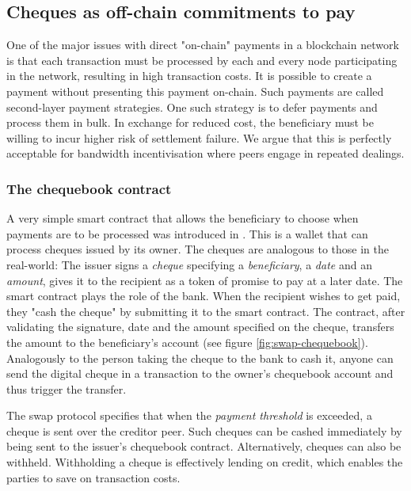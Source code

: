 \subsection{Cheques as off-chain commitments to pay}\label{sec:cheques}

One of the major issues with direct "on-chain" payments in a blockchain network is that each transaction must be processed by each and every node participating in the network, resulting in high transaction costs. It is possible to create a payment without presenting this payment on-chain. Such payments are called second-layer payment strategies. One such strategy is to defer payments and process them in bulk. In exchange for reduced cost, the beneficiary must be willing to incur higher risk of settlement failure. We argue that this is perfectly acceptable for bandwidth incentivisation where peers engage in repeated dealings.


\subsubsection{The chequebook contract}

A very simple smart contract that allows the beneficiary to choose when payments are to be processed was introduced in \cite{ethersphere2016sw3}. This  is a wallet that can process cheques issued by its owner. The cheques are analogous to those in the real-world: The issuer signs a \emph{cheque} specifying a \emph{beneficiary}, a \emph{date} and an \emph{amount}, gives it to the recipient as a token of promise to pay at a later date. The smart contract plays the role of the bank. When the recipient wishes to get paid, they "cash the cheque" by submitting it to the smart contract. The contract, after validating the signature, date and the amount specified on the cheque, transfers the amount to the beneficiary's account (see figure \ref{fig:swap-chequebook}). Analogously to the person taking the cheque to the bank to cash it, anyone can send the digital cheque in a transaction to the owner's chequebook account and thus trigger the transfer. 

The swap protocol specifies that when the \emph{payment threshold} is exceeded, a cheque is sent over the creditor peer. Such cheques can be cashed immediately by being sent to the issuer's chequebook contract. Alternatively, cheques can also be withheld. Withholding a cheque is effectively lending on credit, which enables the parties to save on transaction costs. 

